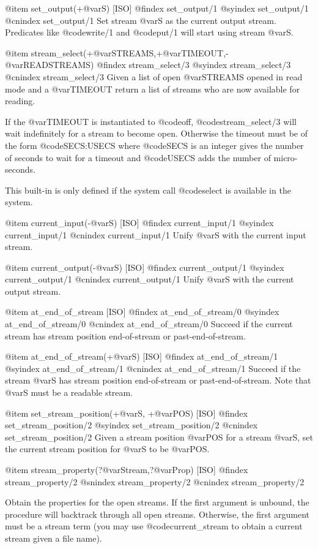 {{{{{@item set_output(+@var{S}) [ISO]
@findex set_output/1
@syindex set_output/1
@cnindex set_output/1
Set stream @var{S} as the current output stream. Predicates like
@code{write/1} and @code{put/1} will start using stream @var{S}.

@item stream_select(+@var{STREAMS},+@var{TIMEOUT},-@var{READSTREAMS})
@findex stream_select/3
@syindex stream_select/3
@cnindex stream_select/3
Given a list of open @var{STREAMS} opened in read mode and a @var{TIMEOUT}
return a list of streams who are now available for reading. 

If the @var{TIMEOUT} is instantiated to @code{off},
@code{stream_select/3} will wait indefinitely for a stream to become
open. Otherwise the timeout must be of the form @code{SECS:USECS} where
@code{SECS} is an integer gives the number of seconds to wait for a timeout
and @code{USECS} adds the number of micro-seconds.

This built-in is only defined if the system call @code{select} is
available in the system.

@item current_input(-@var{S}) [ISO]
@findex current_input/1
@syindex current_input/1
@cnindex current_input/1
Unify @var{S} with the current input stream.

@item current_output(-@var{S}) [ISO]
@findex current_output/1
@syindex current_output/1
@cnindex current_output/1
Unify @var{S} with the current output stream.

@item at_end_of_stream [ISO]
@findex at_end_of_stream/0
@syindex at_end_of_stream/0
@cnindex at_end_of_stream/0
Succeed if the current stream has stream position end-of-stream or
past-end-of-stream.

@item at_end_of_stream(+@var{S}) [ISO]
@findex at_end_of_stream/1
@syindex at_end_of_stream/1
@cnindex at_end_of_stream/1
Succeed if the stream @var{S} has stream position end-of-stream or
past-end-of-stream. Note that @var{S} must be a readable stream.

@item set_stream_position(+@var{S}, +@var{POS}) [ISO]
@findex set_stream_position/2
@syindex set_stream_position/2
@cnindex set_stream_position/2
Given a stream position @var{POS} for a stream @var{S}, set the current
stream position for @var{S} to be @var{POS}.

@item stream_property(?@var{Stream},?@var{Prop}) [ISO]
@findex stream_property/2
@snindex stream_property/2
@cnindex stream_property/2

Obtain the properties for the open streams. If the first argument is
unbound, the procedure will backtrack through all open
streams. Otherwise, the first argument must be a stream term (you may
use @code{current_stream} to obtain a current stream given a file name).

}}}}}
